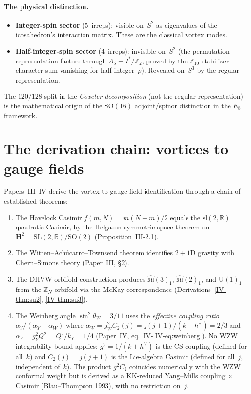 \paragraph{The physical distinction.}
\begin{itemize}
\item \textbf{Integer-spin sector} (5~irreps):
  visible on~$S^2$ as eigenvalues of the icosahedron's interaction
  matrix.  These are the classical vortex modes.
\item \textbf{Half-integer-spin sector} (4~irreps):
  invisible on~$S^2$ (the permutation representation factors through
  $A_5 = I^*/\mathbb{Z}_2$, proved by the $\mathbb{Z}_{10}$
  stabilizer character sum vanishing for half-integer~$\rho$).
  Revealed on~$S^3$ by the regular representation.
\end{itemize}
The $120/128$ split in the \emph{Coxeter decomposition} (not the
regular representation) is the mathematical origin of the
$\mathrm{SO}(16)$ adjoint/spinor distinction in the $E_8$ framework.

\section{The derivation chain: vortices to gauge fields}
\label{sec:derivation-chain}

Papers~III--IV derive the vortex-to-gauge-field identification
through a chain of established theorems:
\begin{enumerate}
\item The Havelock Casimir $f(m,N) = m(N{-}m)/2$ equals the
  $\mathrm{sl}(2,\mathbb{R})$ quadratic Casimir, by the Helgason
  symmetric space theorem on
  $\mathbf{H}^2 = \mathrm{SL}(2,\mathbb{R})/\mathrm{SO}(2)$
  (Proposition~III-2.1).
\item The Witten--Ach\'ucarro--Townsend theorem identifies $2{+}1$D
  gravity with Chern--Simons theory (Paper~III, \S2).
\item The DHVW orbifold construction produces
  $\widehat{\mathfrak{su}}(3)_1$, $\widehat{\mathfrak{su}}(2)_1$,
  and $\mathrm{U}(1)_1$ from the $\mathbb{Z}_N$ orbifold via the
  McKay correspondence
  (Derivations~\ref*{IV-thm:su2}, \ref*{IV-thm:su3}).
\item The Weinberg angle $\sin^2\theta_W = 3/11$ uses the
  \emph{effective coupling ratio}
  $\alpha_Y/(\alpha_Y + \alpha_W)$ where
  $\alpha_W = g_W^2 C_2(j) = j(j{+}1)/(k{+}h^\vee) = 2/3$
  and $\alpha_Y = g_Y^2 Q^2 = Q^2/k_Y = 1/4$
  (Paper~IV, eq.~IV-\ref{IV-eq:weinberg}).
  No WZW integrability bound applies: $g^2 = 1/(k{+}h^\vee)$
  is the CS coupling (defined for all~$k$) and
  $C_2(j) = j(j{+}1)$ is the Lie-algebra Casimir
  (defined for all~$j$, independent of~$k$).
  The product $g^2 C_2$ coincides numerically with the
  WZW conformal weight but is derived as a KK-reduced
  Yang--Mills coupling $\times$ Casimir (Blau--Thompson 1993),
  with no restriction on~$j$.
\end{enumerate}

